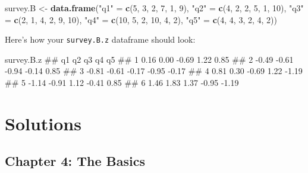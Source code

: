 \documentclass[]{book}
\newenvironment{Shaded}{\begin{snugshade}}{\end{snugshade}}
\newcommand{\KeywordTok}[1]{\textcolor[rgb]{0.13,0.29,0.53}{\textbf{#1}}}
\newcommand{\DecValTok}[1]{\textcolor[rgb]{0.00,0.00,0.81}{#1}}
\newcommand{\StringTok}[1]{\textcolor[rgb]{0.31,0.60,0.02}{#1}}
\newcommand{\NormalTok}[1]{#1}
\theoremstyle{definition}
\theoremstyle{definition}
\theoremstyle{remark}
\begin{document}
\begin{Shaded}
\begin{Highlighting}[]
\NormalTok{survey.B <-}\StringTok{ }\KeywordTok{data.frame}\NormalTok{(}\StringTok{"q1"}\NormalTok{ =}\StringTok{ }\KeywordTok{c}\NormalTok{(}\DecValTok{5}\NormalTok{, }\DecValTok{3}\NormalTok{, }\DecValTok{2}\NormalTok{, }\DecValTok{7}\NormalTok{, }\DecValTok{1}\NormalTok{, }\DecValTok{9}\NormalTok{),}
                     \StringTok{"q2"}\NormalTok{ =}\StringTok{ }\KeywordTok{c}\NormalTok{(}\DecValTok{4}\NormalTok{, }\DecValTok{2}\NormalTok{, }\DecValTok{2}\NormalTok{, }\DecValTok{5}\NormalTok{, }\DecValTok{1}\NormalTok{, }\DecValTok{10}\NormalTok{),}
                     \StringTok{"q3"}\NormalTok{ =}\StringTok{ }\KeywordTok{c}\NormalTok{(}\DecValTok{2}\NormalTok{, }\DecValTok{1}\NormalTok{, }\DecValTok{4}\NormalTok{, }\DecValTok{2}\NormalTok{, }\DecValTok{9}\NormalTok{, }\DecValTok{10}\NormalTok{),}
                     \StringTok{"q4"}\NormalTok{ =}\StringTok{ }\KeywordTok{c}\NormalTok{(}\DecValTok{10}\NormalTok{, }\DecValTok{5}\NormalTok{, }\DecValTok{2}\NormalTok{, }\DecValTok{10}\NormalTok{, }\DecValTok{4}\NormalTok{, }\DecValTok{2}\NormalTok{),}
                     \StringTok{"q5"}\NormalTok{ =}\StringTok{ }\KeywordTok{c}\NormalTok{(}\DecValTok{4}\NormalTok{, }\DecValTok{4}\NormalTok{, }\DecValTok{3}\NormalTok{, }\DecValTok{2}\NormalTok{, }\DecValTok{4}\NormalTok{, }\DecValTok{2}\NormalTok{))}
\end{Highlighting}
\end{Shaded}

Here's how your \texttt{survey.B.z} dataframe should look:

\begin{Shaded}
\begin{Highlighting}[]
\NormalTok{survey.B.z}
\NormalTok{##      q1    q2    q3    q4    q5}
\NormalTok{## 1  0.16  0.00 -0.69  1.22  0.85}
\NormalTok{## 2 -0.49 -0.61 -0.94 -0.14  0.85}
\NormalTok{## 3 -0.81 -0.61 -0.17 -0.95 -0.17}
\NormalTok{## 4  0.81  0.30 -0.69  1.22 -1.19}
\NormalTok{## 5 -1.14 -0.91  1.12 -0.41  0.85}
\NormalTok{## 6  1.46  1.83  1.37 -0.95 -1.19}
\end{Highlighting}
\end{Shaded}

\chapter{Solutions}\label{solutions}

\section{Chapter 4: The Basics}\label{chapter-4-the-basics}
\end{document}

